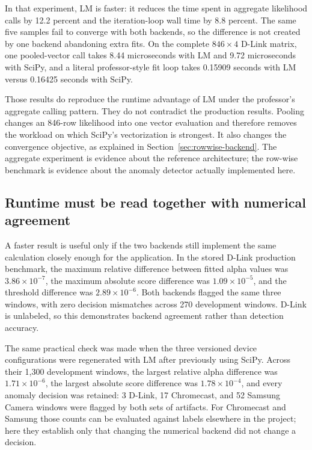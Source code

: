 \documentclass[11pt]{article}
\begin{document}
In that experiment, LM is faster: it reduces the time spent in aggregate
likelihood calls by 12.2 percent and the iteration-loop wall time by 8.8 percent.
The same five samples fail to converge with both backends, so the difference is
not created by one backend abandoning extra fits. On the complete
\(846\times4\) D-Link matrix, one pooled-vector call takes 8.44 microseconds
with LM and 9.72 microseconds with SciPy, and a literal professor-style fit
loop takes 0.15909 seconds with LM versus 0.16425 seconds with SciPy.

Those results do reproduce the runtime advantage of LM under the professor's
aggregate calling pattern. They do not contradict the production results.
Pooling changes an 846-row likelihood into one vector evaluation and therefore
removes the workload on which SciPy's vectorization is strongest. It also
changes the convergence objective, as explained in
Section~\ref{sec:rowwise-backend}. The aggregate
experiment is evidence about the reference architecture; the row-wise
benchmark is evidence about the anomaly detector actually implemented here.

\subsection{Runtime must be read together with numerical agreement}

A faster result is useful only if the two backends still implement the same
calculation closely enough for the application. In the stored D-Link production
benchmark, the maximum relative difference between fitted alpha values was
\(3.86\times10^{-7}\), the maximum absolute score difference was
\(1.09\times10^{-5}\), and the threshold difference was
\(2.89\times10^{-6}\). Both backends flagged the same three windows, with zero
decision mismatches across 270 development windows. D-Link is unlabeled, so
this demonstrates backend agreement rather than detection accuracy.

The same practical check was made when the three versioned device
configurations were regenerated with LM after previously using SciPy. Across
their 1,300 development windows, the largest relative alpha difference was
\(1.71\times10^{-6}\), the largest absolute score difference was
\(1.78\times10^{-4}\), and every anomaly decision was retained: 3 D-Link, 17
Chromecast, and 52 Samsung Camera windows were flagged by both sets of
artifacts. For Chromecast and Samsung those counts can be evaluated against
labels elsewhere in the project; here they establish only that changing the
numerical backend did not change a decision.
\end{document}
